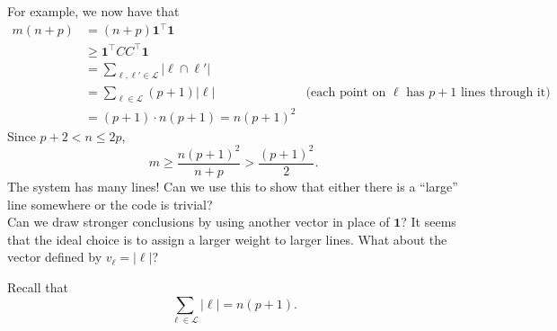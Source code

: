 \documentclass{article}
\begin{document}
	For example, we now have that
	\begin{align*}
		m(n+p) &= (n+p)\textbf{1}^\top \textbf{1} \\
			&\ge \textbf{1}^\top CC^\top \textbf{1} \\
			&= \sum_{\ell,\ell' \in \mathcal{L}} |\ell \cap \ell'| \\
			&= \sum_{\ell \in \mathcal{L}} (p+1)|\ell| & \text{(each point on $\ell$ has $p+1$ lines through it)} \\ 
			&= (p+1) \cdot n(p+1) = n(p+1)^2
	\end{align*}
	Since $p+2 < n \le 2p$,
	\[ m \ge \frac{n(p+1)^2}{n+p} > \frac{(p+1)^2}{2}. \]
	The system has many lines! Can we use this to show that either there is a ``large'' line somewhere or the code is trivial?\\
	Can we draw stronger conclusions by using another vector in place of $\textbf{1}$? It seems that the ideal choice is to assign a larger weight to larger lines. What about the vector defined by $v_{\ell} = |\ell|$?

	Recall that
	\[ \sum_{\ell \in \mathcal{L}} |\ell| = n(p+1). \]
\end{document}
